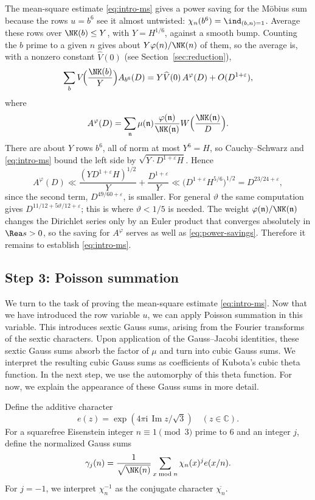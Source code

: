The mean-square estimate \eqref{eq:intro-ms} gives a power saving for the M\"obius sum because
the rows $u=b^6$ see it almost untwisted: $\chi_n(b^6)=\ind_{(b,n)=1}$. Average these rows
over $\NK(b)\le Y$, with $Y=H^{1/6}$, against a smooth bump. Counting the $b$ prime to a given
$n$ gives about $Y\varphi(n)/\NK(n)$ of them, so the average is, with a nonzero constant
$\widehat V(0)$ (see Section~\ref{sec:reduction}),
\begin{equation}\label{eq:intro-extraction}
 \sum_{b}V\!\Bigl(\frac{\NK(b)}{Y}\Bigr)A_{b^6}(D)
 =Y\widehat V(0)\,A^\varphi(D)+O(D^{1+\varepsilon}),
\end{equation}
where
\[
 A^\varphi(D)=\sum_{\mathfrak n}\mu(\mathfrak n)\frac{\varphi(\mathfrak n)}{\NK(\mathfrak n)}
 W\Bigl(\frac{\NK(\mathfrak n)}{D}\Bigr).
\]
There are about $Y$ rows $b^6$, all of norm at most $Y^6=H$, so Cauchy--Schwarz and
\eqref{eq:intro-ms} bound the left side by $\sqrt{Y\cdot D^{1+\varepsilon}H}$. Hence
\[
 A^\varphi(D)\ll\frac{(YD^{1+\varepsilon}H)^{1/2}}{Y}+\frac{D^{1+\varepsilon}}{Y}
 \ll\bigl(D^{1+\varepsilon}H^{5/6}\bigr)^{1/2}=D^{23/24+\varepsilon},
\]
since the second term, $D^{49/60+\varepsilon}$, is smaller.
For general $\vartheta$ the same computation gives $D^{11/12+5\vartheta/12+\varepsilon}$; this
is where $\vartheta<1/5$ is needed. The weight $\varphi(\mathfrak n)/\NK(\mathfrak n)$ changes
the Dirichlet series only by an Euler product that converges absolutely in $\Rea s>0$, so the
saving for $A^\varphi$ serves as well as \eqref{eq:power-savings}.
Therefore it remains to establish \eqref{eq:intro-ms}.

\subsection{Step 3: Poisson summation}

We turn to the task of proving the mean-square estimate \eqref{eq:intro-ms}. Now that we have introduced the row variable $u$, we can apply Poisson summation in this variable. This introduces sextic Gauss sums, arising from the Fourier transforms of the sextic characters. Upon application of the Gauss--Jacobi identities, these sextic Gauss sums absorb the factor of $\mu$ and turn into cubic Gauss sums. We interpret the resulting cubic Gauss sums as coefficients of Kubota's cubic theta function. In the next step, we use the automorphy of this theta function. For now, we explain the appearance of these Gauss sums in more detail.

Define the additive character
\[
 e(z)=\exp(4\pi\mathrm i\,\operatorname{Im}z/\sqrt3)\quad(z\in\mathbb C).
\]
For a squarefree Eisenstein integer $n\equiv1\pmod3$ prime to $6$ and an integer $j$, define the normalized Gauss sums
\begin{equation}\label{eq:intro-gauss-sum}
 \gamma_j(n)=\frac{1}{\sqrt{\NK(n)}}
       \sum_{x\bmod n}\chi_n(x)^j e(x/n).
\end{equation}
For $j=-1$, we interpret $\chi_n^{-1}$ as the conjugate character $\overline{\chi_n}$.

